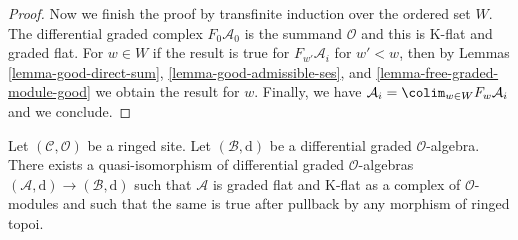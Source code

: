 \begin{proof}
\medskip\noindent
Now we finish the proof by transfinite induction over the ordered
set $W$. The differential graded complex $F_0\mathcal{A}_0$ is
the summand $\mathcal{O}$ and this is K-flat and graded flat.
For $w \in W$ if the result is true for $F_{w'}\mathcal{A}_i$
for $w' < w$, then by Lemmas \ref{lemma-good-direct-sum},
\ref{lemma-good-admissible-ses}, and \ref{lemma-free-graded-module-good}
we obtain the result for $w$. Finally, we have
$\mathcal{A}_i = \colim_{w \in W} F_w\mathcal{A}_i$ and
we conclude.
\end{proof}

\begin{lemma}
\label{lemma-good-dga}
Let $(\mathcal{C}, \mathcal{O})$ be a ringed site.
Let $(\mathcal{B}, \text{d})$ be a differential graded $\mathcal{O}$-algebra.
There exists a quasi-isomorphism of differential graded $\mathcal{O}$-algebras
$(\mathcal{A}, \text{d}) \to (\mathcal{B}, \text{d})$ such that
$\mathcal{A}$ is graded flat and K-flat as a complex of $\mathcal{O}$-modules
and such that the same is true after pullback by any morphism of
ringed topoi.
\end{lemma}

